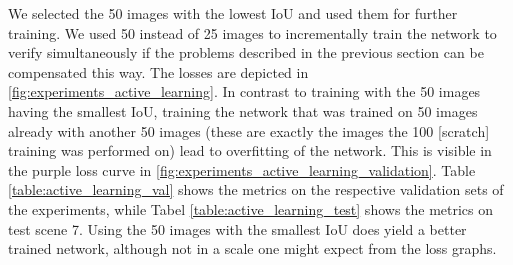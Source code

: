 We selected the 50 images with the lowest IoU and used them for further training. We used 50 instead of 25 images to incrementally train the network to verify simultaneously if the problems described in the previous section can be compensated this way. The losses are depicted in \fig \ref{fig:experiments_active_learning}. In contrast to training with the 50 images having the smallest IoU, training the network that was trained on 50 images already with another 50 images (these are exactly the images the 100 [scratch] training was performed on) lead to overfitting of the network. This is visible in the purple loss curve in \fig \ref{fig:experiments_active_learning_validation}. Table \ref{table:active_learning_val} shows the metrics on the respective validation sets of the experiments, while Tabel \ref{table:active_learning_test} shows the metrics on test scene 7. Using the 50 images with the smallest IoU does yield a better trained network, although not in a scale one might expect from the loss graphs.

